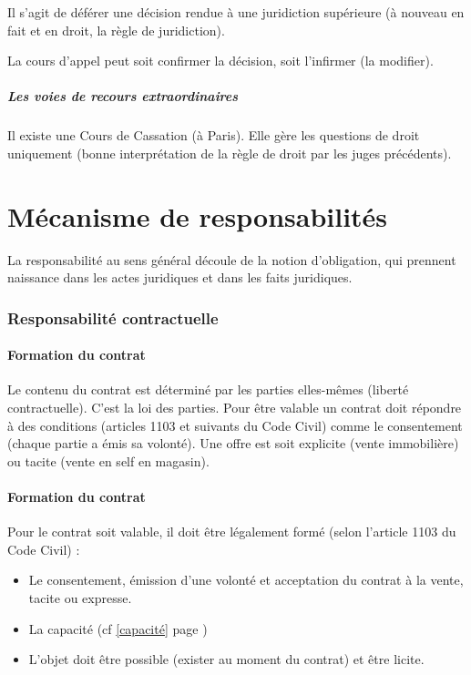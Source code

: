 \documentclass[10pt,a4paper]{article}
\begin{document}
Il s'agit de déférer une décision rendue à une juridiction supérieure (à nouveau en fait et en droit, la règle de juridiction).

La cours d'appel peut soit confirmer la décision, soit l'infirmer (la modifier).

\subsubsection{Les voies de recours extraordinaires}

Il existe une Cours de Cassation (à Paris). Elle gère les questions de droit uniquement (bonne interprétation de la règle de droit par les juges précédents).

\part{Mécanisme de responsabilités}

La responsabilité au sens général découle de la notion d'obligation, qui prennent naissance dans les actes juridiques et dans les faits juridiques.

\section{Responsabilité contractuelle}

\subsection{Formation du contrat}

Le contenu du contrat est déterminé par les parties elles-mêmes (liberté contractuelle). C'est la loi des parties. Pour être valable un contrat doit répondre à des conditions (articles 1103 et suivants du Code Civil) comme le consentement (chaque partie a émis sa volonté). Une offre est soit explicite (vente immobilière) ou tacite (vente en self en magasin).

\subsection{Formation du contrat}

Pour le contrat soit valable, il doit être légalement formé (selon l'article 1103 du Code Civil) :
\begin{itemize}
\item Le consentement, émission d'une volonté et acceptation du contrat à la vente, tacite ou expresse.
\item La capacité (cf \ref{capacité} page \pageref{capacité})
\item L'objet doit être possible (exister au moment du contrat) et être licite.
\end{itemize}
\end{document}

